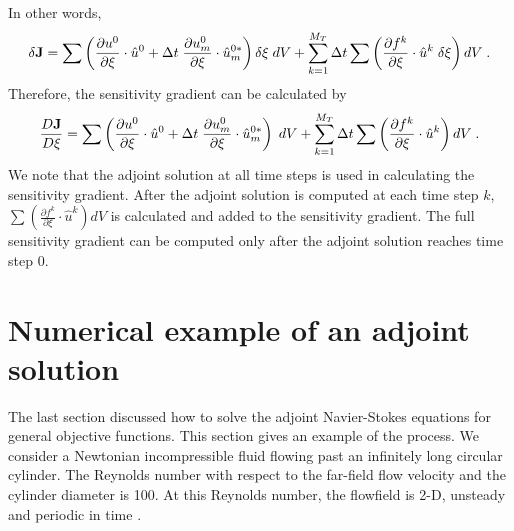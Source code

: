 In other words,
\[ \delta {\bf J}
= \sum \left( \frac{\partial u^0}{\partial\xi} \cdot \hat u^0 +
 \Delta t\; \frac{\partial u_m^0}{\partial\xi} \cdot \hat u_m^{0*} \right)
  \delta \xi\;dV +
 \sum_{k=1}^{M_T} \Delta t
 \sum \left(\frac{\partial f^k}{\partial \xi} \cdot {\hat u}^k
                 \;\delta\xi\right) dV \;.\]
Therefore, the sensitivity gradient can be calculated by
\begin{equation} \label{sensitivity_discrete}
\frac{D {\bf J}}{D \xi}
= \sum \left( \frac{\partial u^0}{\partial\xi} \cdot \hat u^0 +
 \Delta t\; \frac{\partial u_m^0}{\partial\xi} \cdot \hat u_m^{0*} \right)
 \;dV +
 \sum_{k=1}^{M_T} \Delta t
 \sum \left(\frac{\partial f^k}{\partial \xi} \cdot {\hat u}^k \right) dV \;.
\end{equation}
We note that the adjoint solution at all time steps is used in calculating
the sensitivity gradient.  After the adjoint solution is computed at
each time step $k$,
$ \sum \left(\frac{\partial f^k}{\partial \xi} \cdot {\hat u}^k \right) dV $
is calculated and added to the sensitivity gradient.  The full
sensitivity gradient can be computed only after the adjoint solution reaches
time step $0$.



\section{Numerical example of an adjoint solution} \label{s:cylinder_adj}

The last section discussed how to solve the adjoint Navier-Stokes
equations for general objective functions.  This section gives an example of
the process.  We consider a Newtonian incompressible fluid
flowing past an infinitely long circular cylinder.  The Reynolds number
with respect to the far-field flow velocity and the cylinder diameter is 100.
At this Reynolds number, the flowfield is 2-D, unsteady and periodic
in time \cite[]{fey:1547}.


